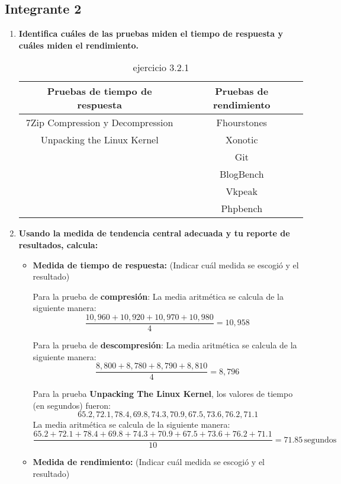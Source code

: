 \documentclass[12pt]{article}
\newcommand{\pl}[1]{\item \textbf{ #1 }}
\begin{document}
\subsection{Integrante 2}

\begin{enumerate}[label=(\arabic{section}.\arabic{subsection}.\arabic{enumi})]
    \pl{Identifica cuáles de las pruebas miden el tiempo de respuesta y cuáles miden el rendimiento.}
    \begin{table}[htb]
        \centering
        \begin{tabular}{|c|c|}
        \hline
        Pruebas de tiempo de respuesta & Pruebas de rendimiento \\
        \hline
        7Zip Compression y Decompression & Fhourstones \\
        \hline
        Unpacking the Linux Kernel & Xonotic \\
        \hline
         & Git \\
        \hline
        & BlogBench \\
        \hline
        & Vkpeak \\
        \hline
        & Phpbench \\
        \hline
        \end{tabular}
        \caption{ejercicio 3.2.1}
    \end{table}\par

    \pl{Usando la medida de tendencia central adecuada y tu reporte de resultados, calcula:}
    \begin{itemize}
        \pl{Medida de tiempo de respuesta:}(Indicar cuál medida se escogió y el resultado)\par
    	Para la prueba de \textbf{compresión}:
La media aritmética se calcula de la siguiente manera:
\[
\frac{10,960 + 10,920 + 10,970 + 10,980}{4} = 10,958 \, 
\]

Para la prueba de \textbf{descompresión}:
La media aritmética se calcula de la siguiente manera:
\[
\frac{8,800 + 8,780 + 8,790 + 8,810}{4} = 8,796 \, 
\]

Para la prueba \textbf{Unpacking The Linux Kernel}, los valores de tiempo (en segundos) fueron:
\[
65.2, 72.1, 78.4, 69.8, 74.3, 70.9, 67.5, 73.6, 76.2, 71.1
\]
La media aritmética se calcula de la siguiente manera:
\[
\frac{65.2 + 72.1 + 78.4 + 69.8 + 74.3 + 70.9 + 67.5 + 73.6 + 76.2 + 71.1}{10} = 71.85 \, \text{segundos}
\]
        \pl{Medida de rendimiento:} (Indicar cuál medida se escogió y el resultado)\par
       

\end{itemize}
\end{enumerate}
\end{document}
